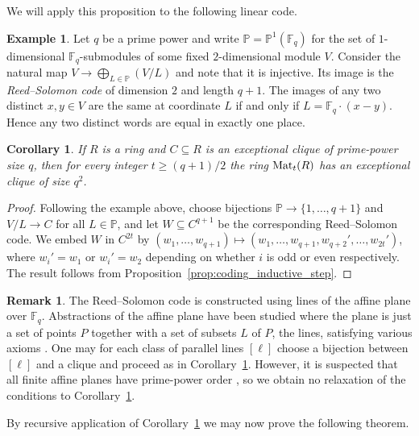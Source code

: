 \documentclass{amsart}
\theoremstyle{plain}
\newtheorem{corollary}[theorem]{Corollary}
\theoremstyle{definition}
\newtheorem{remark}[theorem]{Remark}
\newtheorem{example}[theorem]{Example}
\newcommand{\F}{\ensuremath{\mathbb{F}}}
\newcommand{\clq}{C}
\newcommand{\nrg}{R}
\begin{document}
We will apply this proposition to the following linear code.

\begin{example}\label{ex:RS_def}
	Let \(q\) be a prime power and write \(\mathbb{P}=\mathbb{P}^1(\F_q)\) for the set of \(1\)-dimensional \(\F_q\)-submodules of some fixed \(2\)-dimensional module \(V\).
	Consider the natural map \(V\to\bigoplus_{L\in\mathbb{P}} (V/L)\) and note that it is injective.
	Its image is the \emph{Reed--Solomon code} of dimension \(2\) and length \(q+1\).
	The images of any two distinct \(x,y\in V\) are the same at coordinate \(L\) if and only if \(L=\F_q\cdot(x-y)\).
	Hence any two distinct words are equal in exactly one place.
\end{example}

\begin{corollary}\label{cor:coding_inductive_step}
	If \(\nrg\) is a ring and \(\clq\subseteq \nrg\) is an exceptional clique of prime-power size \(q\), then for every integer \(t\geq (q+1)/2\) the ring \(\textup{Mat}_t(\nrg)\) has an exceptional clique of size \(q^2\).
\end{corollary}
\begin{proof}
	Following the example above, choose bijections \(\mathbb{P}\to\{1,\dotsc,q+1\}\) and \(V/L\to \clq\) for all \(L\in\mathbb{P}\), and let \(W\subseteq \clq^{q+1}\) be the corresponding Reed--Solomon code.
	We embed \(W\) in \(\clq^{2t}\) by \((w_1,\dotsc,w_{q+1})\mapsto (w_1,\dotsc,w_{q+1},w_{q+2}',\dotsc,w_{2t}')\), where \(w_i'=w_1\) or \(w_i'=w_2\) depending on whether \(i\) is odd or even respectively. The result follows from Proposition~\ref{prop:coding_inductive_step}.
\end{proof}

\begin{remark}
	The Reed--Solomon code is constructed using lines of the affine plane over $\F_q$. 
	Abstractions of the affine plane have been studied where the plane is just a set of points \(P\) together with a set of subsets \(L\) of \(P\), the lines, satisfying various axioms \cite{AffinePlanes}.
	One may for each class of parallel lines \([\ell]\) choose a bijection between \([\ell]\) and a clique and proceed as in Corollary~\ref{cor:coding_inductive_step}.
	However, it is suspected that all finite affine planes have prime-power order \cite[p.\ 144]{AffinePlanes}, so we obtain no relaxation of the conditions to Corollary~\ref{cor:coding_inductive_step}.
\end{remark}

By recursive application of Corollary~\ref{cor:coding_inductive_step} we may now prove the following theorem.
\end{document}
